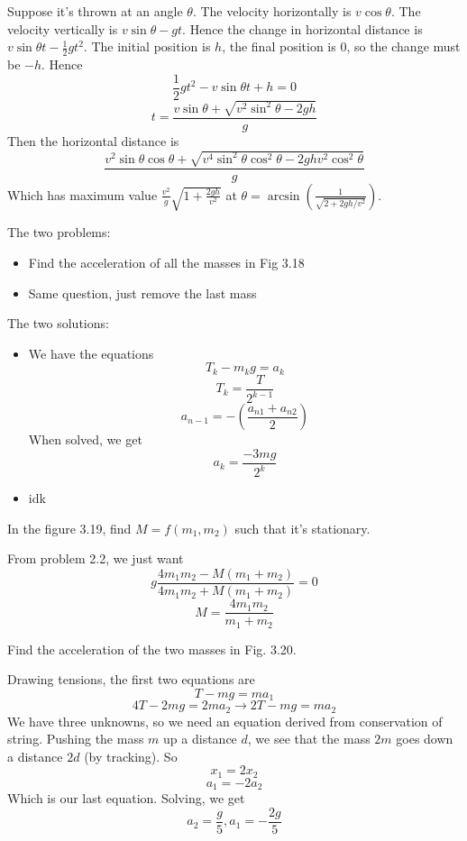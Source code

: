 \documentclass[11pt]{scrartcl}
\begin{document}
\begin{soln}
  Suppose it's thrown at an angle $\theta$. The velocity horizontally is $v\cos\theta$.
  The velocity vertically is $v\sin\theta-gt$. Hence the change in horizontal distance is $v\sin\theta t-\frac{1}{2}gt^2$.
  The initial position is $h$, the final position is $0$, so the change must be $-h$. Hence
  $$\frac{1}{2}gt^2-v\sin\theta t+h=0$$
  $$t=\frac{v\sin\theta+\sqrt{v^2\sin^2\theta-2gh}}{g}$$
  Then the horizontal distance is
  $$\frac{v^2\sin\theta\cos\theta+\sqrt{v^4\sin^2\theta\cos^2\theta-2ghv^2\cos^2\theta}}{g}$$
  Which has maximum value $\frac{v^2}{g}\sqrt{1+\frac{2gh}{v^2}}$ at $\theta=\arcsin\left(\frac{1}{\sqrt{2+2gh/v^2}}\right)$.
\end{soln}
\begin{example}
  [3.25]
  The two problems:
  \begin{itemize}
    \item Find the acceleration of all the masses in Fig 3.18
    \item Same question, just remove the last mass
  \end{itemize}
\end{example}
\begin{soln}
  The two solutions:
  \begin{itemize}
    \item We have the equations
      $$T_k-m_k g=a_k$$
      $$T_k=\frac{T}{2^{k-1}}$$
      $$a_{n-1}=-\left(\frac{a_{n1}+a_{n2}}{2}\right)$$
      When solved, we get
      $$a_k=\frac{-3mg}{2^k}$$
    \item idk
  \end{itemize}
\end{soln}
\begin{example}
  [3.26]
  In the figure 3.19, find $M=f(m_1, m_2)$ such that it's stationary.
\end{example}
\begin{soln}
  From problem 2.2, we just want
  $$g\frac{4m_1m_2-M(m_1+m_2)}{4m_1m_2+M(m_1+m_2)}=0$$
  $$M=\frac{4m_1m_2}{m_1+m_2}$$
\end{soln}
\begin{example}
  [3.27]
  Find the acceleration of the two masses in Fig. 3.20.
\end{example}
\begin{soln}
  Drawing tensions, the first two equations are
  $$T-mg=ma_1$$
  $$4T-2mg=2ma_2\to 2T-mg=ma_2$$
  We have three unknowns, so we need an equation derived from conservation
  of string. Pushing the mass $m$ up a distance $d$, we see that
  the mass $2m$ goes down a distance $2d$ (by tracking). So
  $$x_1=2x_2$$
  $$a_1=-2a_2$$
  Which is our last equation. Solving, we get
  $$a_2=\frac{g}{5}, a_1=-\frac{2g}{5}$$
\end{soln}
\end{document}
